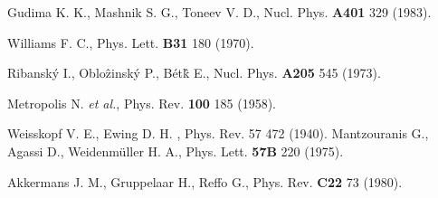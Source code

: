 \begin{thebibliography}{599}

 Gudima K. K., Mashnik S. G., Toneev V. D., Nucl. Phys. {\bf
A401} 329 (1983).
 
 Williams F. C., Phys. Lett. {\bf B31} 180 (1970).

 Ribansk\'y I., Oblo\^zinsk\'y P., B\'et\^k E., 
Nucl. Phys. {\bf A205}
545 (1973).

 Metropolis N. {\it et al.}, Phys. Rev. {\bf 100} 185 (1958).

 Weisskopf V. E., Ewing D. H. , Phys. Rev. {57} 472 (1940).
 Mantzouranis G., Agassi D., Weidenm\"uller H. A., Phys. Lett. 
{\bf 57B} 220 (1975).

 Akkermans J. M., Gruppelaar H., Reffo G., Phys. Rev. {\bf
C22} 73 (1980).

\end{thebibliography}
